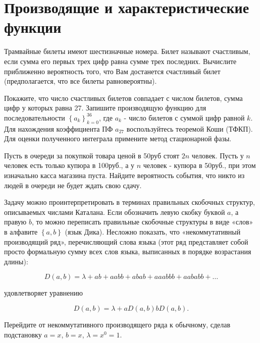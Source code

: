 \section{Производящие и характеристические функции}


\begin{problem}
Трамвайные билеты имеют шестизначные номера. Билет называют счастливым, если 
сумма его первых трех цифр равна сумме трех последних. Вычислите приближенно 
вероятность того, что Вам достанется счастливый билет (предполагается, что 
все билеты равновероятны).

\end{problem}

\begin{ordre}
Покажите, что число счастливых билетов совпадает с числом билетов, 
сумма цифр у которых равна 27. Запишите производящую функцию для 
последовательности $\left\{ {a_k } \right\}_{k=0}^{36} $, где $a_k $ - число 
билетов с суммой цифр равной $k$. Для нахождения коэффициента ПФ $a_{27} $ 
воспользуйтесь теоремой Коши (ТФКП). Для оценки полученного интеграла примените 
метод стационарной фазы.
\end{ordre}

\begin{problem}
Пусть в очереди за покупкой товара ценой в 
50руб стоят $2n$ человек. Пусть у $n$ человек есть только купюра в 100руб., 
а у $n$ человек - купюра в 50руб., при этом изначально касса магазина пуста. 
Найдите вероятность события, что никто из людей в очереди не будет ждать 
свою сдачу.
\end{problem}

\begin{ordre}
Задачу можно проинтерпретировать в терминах правильных скобочных структур, описываемых числами Каталана. Если обозначить левую скобку буквой $a$, а правую $b$, то можно переписать правильные скобочные структуры в виде «слов» в алфавите $\left\{a,b\right\}$ (язык Дика). Несложно показать, что «некоммутативный производящий ряд», перечисляющий слова языка (этот ряд представляет собой просто формальную сумму всех слов языка, выписанных в порядке возрастания длины):

\[D(a,b)=\lambda +ab+aabb+abab+aaabbb+aababb+\ldots \] 

удовлетворяет уравнению

\[D(a,b)=\lambda +aD(a,b)bD(a,b).\] 

Перейдите от некоммутативного производящего ряда к обычному, сделав подстановку $a=x$, $b=x$, $\lambda =x^{0} =1$.
\end{ordre}


